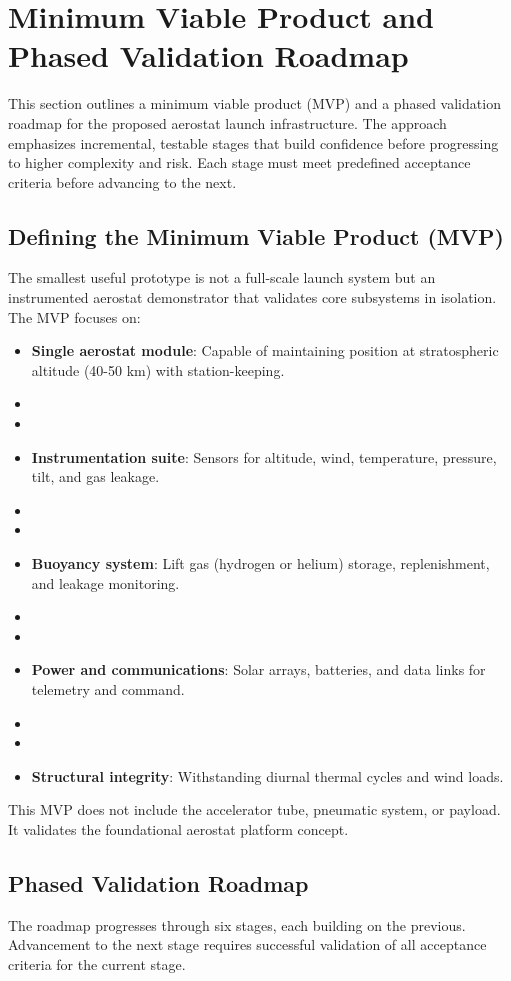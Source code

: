 \section{Minimum Viable Product and Phased Validation Roadmap}
\label{sec:mvp}

This section outlines a minimum viable product (MVP) and a phased validation roadmap for the proposed aerostat launch infrastructure. The approach emphasizes incremental, testable stages that build confidence before progressing to higher complexity and risk. Each stage must meet predefined acceptance criteria before advancing to the next.

\subsection{Defining the Minimum Viable Product (MVP)}
The smallest useful prototype is not a full-scale launch system but an instrumented aerostat demonstrator that validates core subsystems in isolation. The MVP focuses on:
\begin{itemize}
    \item \textbf{Single aerostat module}: Capable of maintaining position at stratospheric altitude (40-50 km) with station-keeping.
    \item \item \item \textbf{Instrumentation suite}: Sensors for altitude, wind, temperature, pressure, tilt, and gas leakage.
    \item \item \item \textbf{Buoyancy system}: Lift gas (hydrogen or helium) storage, replenishment, and leakage monitoring.
    \item \item \item \textbf{Power and communications}: Solar arrays, batteries, and data links for telemetry and command.
    \item \item \item \textbf{Structural integrity}: Withstanding diurnal thermal cycles and wind loads.
\end{itemize}
This MVP does not include the accelerator tube, pneumatic system, or payload. It validates the foundational aerostat platform concept.

\subsection{Phased Validation Roadmap}
The roadmap progresses through six stages, each building on the previous. Advancement to the next stage requires successful validation of all acceptance criteria for the current stage.

